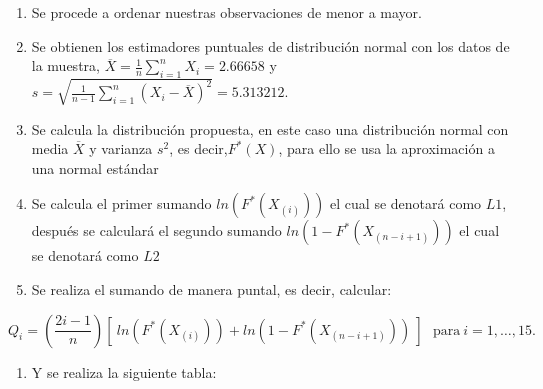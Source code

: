 \documentclass[
  a4paper,
  oneside,
  openany]{book}
\providecommand{\tightlist}{%
  \setlength{\itemsep}{0pt}\setlength{\parskip}{0pt}}
\begin{document}
\begin{enumerate}
\def\labelenumi{\arabic{enumi})}
\item
  Se procede a ordenar nuestras observaciones de menor a mayor.
\item
  Se obtienen los estimadores puntuales de distribución normal con los datos de la muestra,
  \(\overline{X}=\frac{1}{n}\sum_{i=1}^{n}X_{i}= 2.66658\) y \(s=\sqrt{\frac{1}{n-1}\sum_{i=1}^{n}(X_{i}-\overline{X})^2}=5.313212.\)
\item
  Se calcula la distribución propuesta, en este caso una distribución normal con media \(\overline{X}\) y varianza \(s^2\), es decir,\(F^*(X)\), para ello se usa la aproximación a una normal estándar
\item
  Se calcula el primer sumando \(ln(F^*(X_{(i)}))\) el cual se denotará como \(L1\), después se calculará el segundo sumando \(ln(1-F^*(X_{(n-i+1)}))\) el cual se denotará como \(L2\)
\item
  Se realiza el sumando de manera puntal, es decir, calcular:
\end{enumerate}

\[Q_{i}=\left(\frac{2i-1}{n}\right)[ \ ln(F^*(X_{(i)})) +ln(1-F^*(X_{(n-i+1)})) \ ] \ \ \ \mbox{para} \  i=1,\ldots,15.\]

\begin{enumerate}
\def\labelenumi{\arabic{enumi})}
\setcounter{enumi}{5}
\tightlist
\item
  Y se realiza la siguiente tabla:
\end{enumerate}
\end{document}
